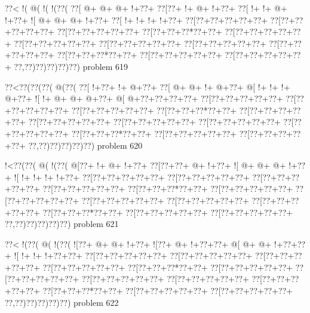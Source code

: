 \vbox{\vbox{\goo
\0??<\- !(\- @(\- !(\- !(\0??(
\0??[\- @+\- @+\- @+\- !+\0??+
\0??[\0??+\- !+\- @+\- !+\0??+
\0??[\- !+\- !+\- @+\- !+\0??+
\- ![\- @+\- @+\- @+\- !+\0??+
\0??[\- !+\- !+\- !+\- !+\0??+
\0??[\0??+\0??+\0??+\0??+\0??+
\0??[\0??+\0??+\0??+\0??+\0??+
\0??[\0??+\0??+\0??+\0??+\0??+
\0??[\0??+\0??+\0??*\0??+\0??+
\0??[\0??+\0??+\0??+\0??+\0??+
\0??[\0??+\0??+\0??+\0??+\0??+
\0??[\0??+\0??+\0??+\0??+\0??+
\0??[\0??+\0??+\0??+\0??+\0??+
\0??[\0??+\0??+\0??+\0??+\0??+
\0??[\0??+\0??+\0??*\0??+\0??+
\0??[\0??+\0??+\0??+\0??+\0??+
\0??[\0??+\0??+\0??+\0??+\0??+
\0??,\0??)\0??)\0??)\0??)\0??)
}
\hfil problem 619\hfil\break
}

\vbox{\vbox{\goo
\0??<\0??(\0??(\0??(\- @(\0??(
\0??[\- !+\0??+\- !+\- @+\0??+
\0??[\- @+\- @+\- !+\- @+\0??+
\- @[\- !+\- !+\- !+\- @+\0??+
\- ![\- !+\- @+\- @+\- @+\0??+
\- @[\- @+\0??+\0??+\0??+\0??+
\0??[\0??+\0??+\0??+\0??+\0??+
\0??[\0??+\0??+\0??+\0??+\0??+
\0??[\0??+\0??+\0??+\0??+\0??+
\0??[\0??+\0??+\0??*\0??+\0??+
\0??[\0??+\0??+\0??+\0??+\0??+
\0??[\0??+\0??+\0??+\0??+\0??+
\0??[\0??+\0??+\0??+\0??+\0??+
\0??[\0??+\0??+\0??+\0??+\0??+
\0??[\0??+\0??+\0??+\0??+\0??+
\0??[\0??+\0??+\0??*\0??+\0??+
\0??[\0??+\0??+\0??+\0??+\0??+
\0??[\0??+\0??+\0??+\0??+\0??+
\0??,\0??)\0??)\0??)\0??)\0??)
}
\hfil problem 620\hfil\break
}

\vbox{\vbox{\goo
\- !<\0??(\0??(\- @(\- !(\0??(
\- @[\0??+\- !+\- @+\- !+\0??+
\0??[\0??+\0??+\- @+\- !+\0??+
\- ![\- @+\- @+\- @+\- !+\0??+
\- ![\- !+\- !+\- !+\- !+\0??+
\0??[\0??+\0??+\0??+\0??+\0??+
\0??[\0??+\0??+\0??+\0??+\0??+
\0??[\0??+\0??+\0??+\0??+\0??+
\0??[\0??+\0??+\0??+\0??+\0??+
\0??[\0??+\0??+\0??*\0??+\0??+
\0??[\0??+\0??+\0??+\0??+\0??+
\0??[\0??+\0??+\0??+\0??+\0??+
\0??[\0??+\0??+\0??+\0??+\0??+
\0??[\0??+\0??+\0??+\0??+\0??+
\0??[\0??+\0??+\0??+\0??+\0??+
\0??[\0??+\0??+\0??*\0??+\0??+
\0??[\0??+\0??+\0??+\0??+\0??+
\0??[\0??+\0??+\0??+\0??+\0??+
\0??,\0??)\0??)\0??)\0??)\0??)
}
\hfil problem 621\hfil\break
}

\vbox{\vbox{\goo
\0??<\- !(\0??(\- @(\- !(\0??(
\- ![\0??+\- @+\- @+\- !+\0??+
\- ![\0??+\- @+\- !+\0??+\0??+
\- @[\- @+\- @+\- !+\0??+\0??+
\- ![\- !+\- !+\- !+\0??+\0??+
\0??[\0??+\0??+\0??+\0??+\0??+
\0??[\0??+\0??+\0??+\0??+\0??+
\0??[\0??+\0??+\0??+\0??+\0??+
\0??[\0??+\0??+\0??+\0??+\0??+
\0??[\0??+\0??+\0??*\0??+\0??+
\0??[\0??+\0??+\0??+\0??+\0??+
\0??[\0??+\0??+\0??+\0??+\0??+
\0??[\0??+\0??+\0??+\0??+\0??+
\0??[\0??+\0??+\0??+\0??+\0??+
\0??[\0??+\0??+\0??+\0??+\0??+
\0??[\0??+\0??+\0??*\0??+\0??+
\0??[\0??+\0??+\0??+\0??+\0??+
\0??[\0??+\0??+\0??+\0??+\0??+
\0??,\0??)\0??)\0??)\0??)\0??)
}
\hfil problem 622\hfil\break
}

